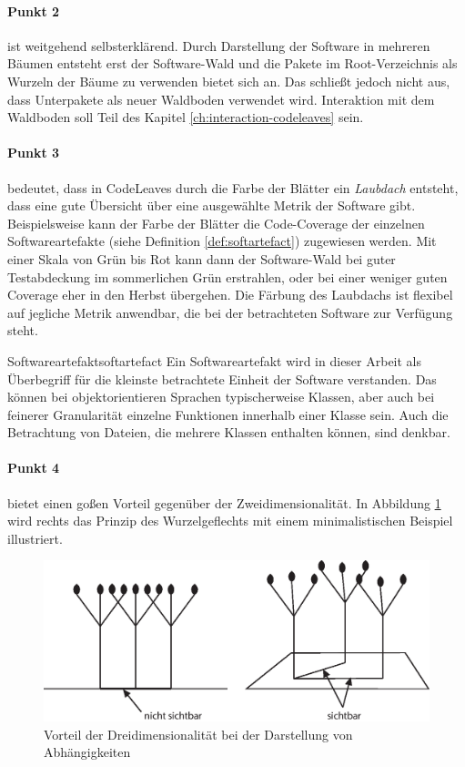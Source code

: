 \paragraph{Punkt 2} ist weitgehend selbsterklärend. Durch Darstellung der Software in mehreren Bäumen entsteht erst der Software-Wald und die Pakete im Root-Verzeichnis als Wurzeln der Bäume zu verwenden bietet sich an. Das schließt jedoch nicht aus, dass Unterpakete als neuer Waldboden verwendet wird. Interaktion mit dem Waldboden soll Teil des Kapitel \ref{ch:interaction-codeleaves} sein.

\paragraph{Punkt 3} bedeutet, dass in CodeLeaves durch die Farbe der Blätter ein \emph{Laubdach} entsteht, dass eine gute Übersicht über eine ausgewählte Metrik der Software gibt. Beispielsweise kann der Farbe der Blätter die Code-Coverage der einzelnen Softwareartefakte (siehe Definition \ref{def:softartefact}) zugewiesen werden. Mit einer Skala von Grün bis Rot kann dann der Software-Wald bei guter Testabdeckung im sommerlichen Grün erstrahlen, oder bei einer weniger guten Coverage eher in den Herbst übergehen. Die Färbung des Laubdachs ist flexibel auf jegliche Metrik anwendbar, die bei der betrachteten Software zur Verfügung steht.

\begin{defbox}{Softwareartefakt}{softartefact}
  Ein Softwareartefakt wird in dieser Arbeit als Überbegriff für die kleinste betrachtete Einheit der Software verstanden. Das können bei objektorientieren Sprachen typischerweise Klassen, aber auch bei feinerer Granularität einzelne Funktionen innerhalb einer Klasse sein. Auch die Betrachtung von Dateien, die mehrere Klassen enthalten können, sind denkbar.
\end{defbox}

\paragraph{Punkt 4} bietet einen goßen Vorteil gegenüber der Zweidimensionalität. In Abbildung \ref{fig:3d-advantage} wird rechts das Prinzip des Wurzelgeflechts mit einem minimalistischen Beispiel illustriert.

\begin{figure}[htb]
  \includegraphics[width=.8\textwidth]{figures/3d-advantage}
  \caption{Vorteil der Dreidimensionalität bei der Darstellung von Abhängigkeiten}
  \label{fig:3d-advantage}
\end{figure}

